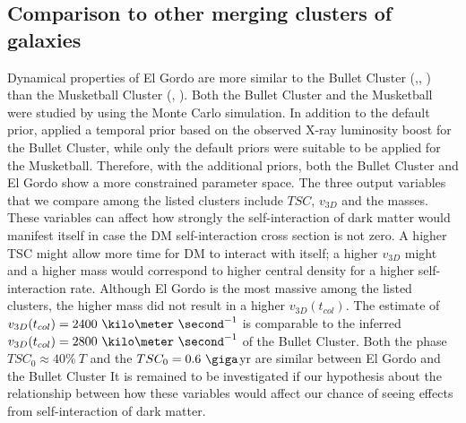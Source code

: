 \subsection{Comparison to other merging clusters of galaxies}
%
Dynamical properties of El Gordo are more similar to the Bullet Cluster
(\citealt{Bradac2006b},\citealt{Springel2007},
\citealt{Mastropietro2008a})
than the Musketball Cluster (\citealt{Dawson12}, ). Both the Bullet Cluster and the Musketball
were studied by  using the Monte Carlo simulation.
In addition to the default prior,  applied a temporal prior
based on the observed X-ray luminosity boost for the Bullet Cluster, while
only the default priors were suitable to be applied for the Musketball.
Therefore, with the additional priors, both the Bullet Cluster and El Gordo
show a more constrained parameter space. 
The three output variables that we compare among the listed clusters include $TSC$,
$v_{3D}$ and the masses. These variables can affect
how strongly the self-interaction of dark matter would manifest itself in
case the DM self-interaction cross section is not zero. A higher TSC might
allow more time for DM to interact with itself; a higher $v_{3D}$ might
 and a higher mass would correspond to
higher central density for a higher self-interaction rate. Although El
Gordo is the most massive among the listed clusters, the higher mass did not result in a higher $v_{3D}(t_{col})$.
The estimate of $v_{3D}(t_{col}) = 2400~\kilo\meter~\second^{-1}$ is
comparable to the inferred $v_{3D}(t_{col}) =
2800~\kilo\meter~\second^{-1}$ of the Bullet Cluster. 
Both the phase $TSC_0  \approx 40\%~T$ and the $TSC_0 = 0.6~\giga$yr are
similar between El Gordo and the Bullet Cluster
It is remained to be investigated if our hypothesis about the relationship
between how these variables would affect our chance of seeing effects from
self-interaction of dark matter. 

